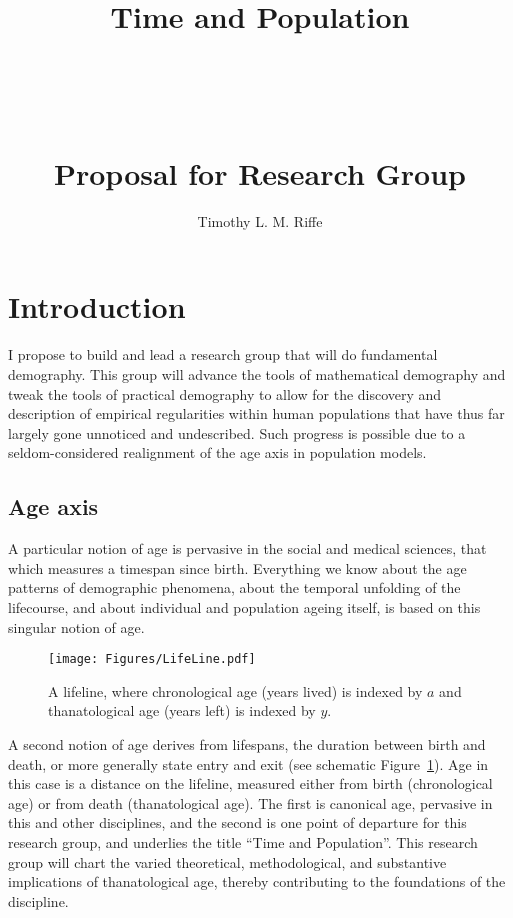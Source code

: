 \documentclass[a4paper,12pt]{article}
\begin{document}
\title{\vspace{-15mm}
\fontsize{25pt}{10pt}\selectfont
\textbf{
\hfill
\Huge{Time} \huge{and} \Huge{Population} \hfill\hfill 
} \\ ~ \\~ \\~ \\ \huge{Proposal for Research Group}}
\author{Timothy L. M. Riffe}
\maketitle

\onehalfspacing

\section{Introduction}
I propose to build and lead a research group that will do fundamental
demography. This group will advance the tools of mathematical demography and
tweak the tools of practical demography to allow for the discovery and description of empirical regularities
within human populations that have thus far largely gone unnoticed and
undescribed. Such progress is possible due to a seldom-considered realignment of
the age axis in population models.

\subsection*{Age axis}
A particular notion of age is pervasive in the social and medical sciences, that
which measures a timespan since birth.
Everything we know about the age patterns of demographic phenomena, about the temporal
unfolding of the lifecourse, and about individual and population ageing itself,
is based on this singular notion of age. 

\begin{figure}[h]
\centering
	\caption{A lifeline, where chronological age (years lived) is indexed by $a$
	and thanatological age (years left) is indexed by $y$.}
	\label{fig:line}
	\texttt{[image: Figures/LifeLine.pdf]}	
\end{figure}

A second notion of age derives from lifespans, the duration between birth and
death, or more generally state entry and exit (see schematic
Figure~\ref{fig:line}).
Age in this case is a distance on the lifeline, measured either from birth (chronological age) or from death
(thanatological age). The first is canonical age, pervasive in this and
other disciplines, and the second is one point of departure for this research
group, and underlies the title ``Time and Population''. This research group
will chart the varied theoretical, methodological, and substantive
implications of thanatological age, thereby contributing to the foundations of the discipline.
\end{document}
